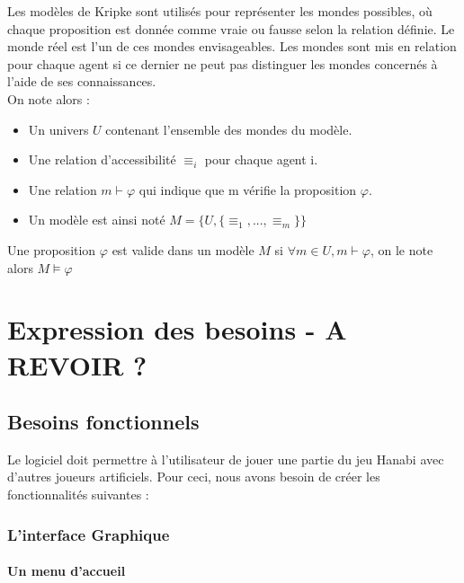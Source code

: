 \documentclass[11pt, letterpaper]{article}
\begin{document}
\noindent Les modèles de Kripke sont utilisés pour représenter les mondes possibles, où chaque proposition est donnée comme vraie ou fausse selon la relation définie. Le monde réel est l'un de ces mondes envisageables. Les mondes sont mis en relation pour chaque agent si ce dernier ne peut pas distinguer les mondes concernés à l'aide de ses connaissances.\\

On note alors :
\begin{itemize}
    \item Un univers $U$ contenant l'ensemble des mondes du modèle.
    \item Une relation d'accessibilité $\equiv_i$ pour chaque agent i.
    \item Une relation  $m \vdash \varphi$ qui indique que m vérifie la proposition $\varphi$. 
    \item Un modèle est ainsi noté $M=\{U, \{\equiv_1, ..., \equiv_m \} \}$\\
\end{itemize}
Une proposition $\varphi$ est valide dans un modèle $M$ si $\forall m \in U, m \vdash \varphi$, on le note alors $M \models \varphi$

\section {Expression des besoins - A REVOIR ?}

\subsection{Besoins fonctionnels}

\noindent
Le logiciel doit permettre à l'utilisateur de jouer une partie du jeu Hanabi avec d'autres joueurs artificiels. Pour ceci, nous avons besoin de créer les fonctionnalités suivantes : 

\subsubsection{L'interface Graphique}

\paragraph{Un menu d'accueil}
\end{document}
